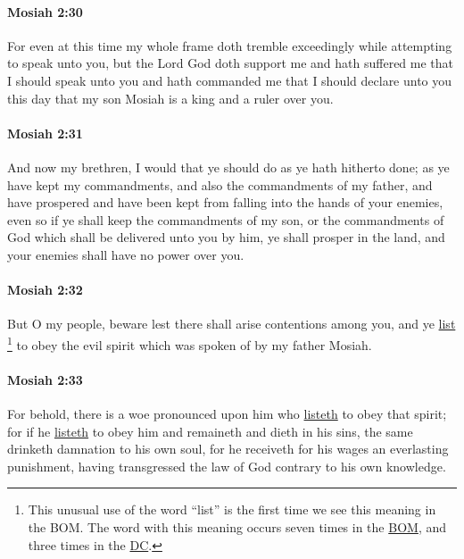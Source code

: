 		\paragraph{Mosiah 2:30} %
			\label{MOSIAH-2-30}
			
			For even at this time my whole frame doth tremble exceedingly
			while attempting to speak unto you,
			but the Lord God doth support me
			and hath suffered me that I should speak unto you
			and hath commanded me that I should declare unto you this day
			that my son Mosiah is a king and a ruler over you.
			
		\paragraph{Mosiah 2:31} %
			\label{MOSIAH-2-31}

			And now my brethren, I would that ye should do as ye hath hitherto done;
			as ye have kept my commandments,
			and also the commandments of my father,
			and have prospered and have been kept
			from falling into the hands of your enemies,
			even so if ye shall keep the commandments of my son,
			or the commandments of God which shall be delivered unto you by him,
			ye shall prosper in the land,
			and your enemies shall have no power over you.

		\paragraph{Mosiah 2:32} %
			\label{MOSIAH-2-32}

			But O my people, beware lest there shall arise contentions among you,
			and ye \hyperref[LIST-1828]{list}%
				\footnote{%
					\label{MOSIAH-2-32-NOTE-list}%
					This unusual use of the word ``list'' is the first time we see this meaning in the BOM. The word with this meaning occurs seven times in the \hyperref[LIST-BOM]{BOM}, and three times in the \hyperref[LIST-DC]{DC}.
					}
			to obey the evil spirit which was spoken of by my father Mosiah.

		\paragraph{Mosiah 2:33} %
			\label{MOSIAH-2-33}

			For behold, there is a woe pronounced upon him who \hyperref[LIST-1828]{listeth} to obey that spirit;
			for if he \hyperref[LIST-1828]{listeth} to obey him and remaineth and dieth in his sins,
			the same drinketh damnation to his own soul,
			for he receiveth for his wages an everlasting punishment,
			having transgressed the law of God contrary to his own knowledge.

